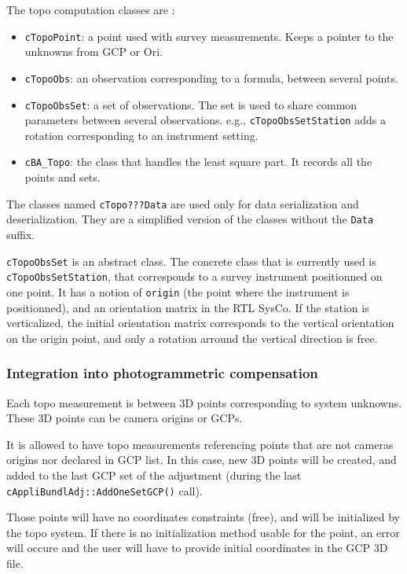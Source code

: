 The topo computation classes are :
 \begin{itemize}
    \item \texttt{cTopoPoint}: a point used with survey measurements. Keeps a pointer to the unknowns from GCP or Ori.
    \item \texttt{cTopoObs}: an observation corresponding to a formula, between several points.
    \item \texttt{cTopoObsSet}: a set of observations. The set is used to share common parameters between several observations. e.g., \texttt{cTopoObsSetStation} adds a rotation corresponding to an instrument setting.   
    \item \texttt{cBA\_Topo}: the class that handles the least square part. It records all the points and sets.
 \end{itemize}

The classes named \texttt{cTopo???Data} are used only for data serialization and deserialization.
They are a simplified version of the classes without the \texttt{Data} suffix.


\texttt{cTopoObsSet} is an abstract class.
The concrete class that is currently used is \texttt{cTopoObsSetStation}, that corresponds to a survey instrument positionned on one point.
It has a notion of {\tt origin} (the point where the instrument is positionned), and an orientation matrix in the RTL SysCo.
If the station is verticalized, the initial orientation matrix corresponds to the vertical orientation on the origin point, and only a rotation arround the vertical direction is free.

\subsubsection{Integration into photogrammetric compensation}

Each topo measurement is between 3D points corresponding to system unknowns. These 3D points can be camera origins or GCPs.

It is allowed to have topo measurements referencing points that are not cameras origins nor declared in GCP list.
In this case, new 3D points will be created, and added to the last GCP set of the adjustment (during the last \texttt{cAppliBundlAdj::AddOneSetGCP()} call).

Those points will have no coordinates constraints (free), and will be initialized by the topo system. If there is no initialization method usable for the point,
an error will occure and the user will have to provide initial coordinates in the GCP 3D file.



